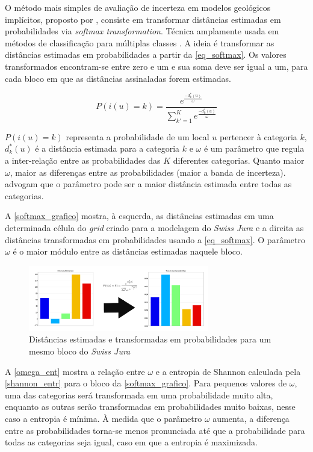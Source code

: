 O método mais simples de avaliação de incerteza em modelos geológicos implícitos, proposto por , consiste em transformar distâncias estimadas em probabilidades via \textit{softmax transformation}. Técnica amplamente usada em métodos de classificação para múltiplas classes \cite{mccullaghgeneralizedlinear}. A ideia é transformar as distâncias estimadas em probabilidades a partir da \autoref{eq_softmax}. Os valores transformados encontram-se entre zero e um e sua soma deve ser igual a um, para cada bloco em que as distâncias assinaladas forem estimadas.

\begin{equation}
	P(i(u)=k)=\frac{e^\frac{-d^*_k(u)}{\omega}}{\sum_{k'=1}^{K}e^\frac{-d^*_k(u)}{\omega}}
    \label{eq_softmax}
\end{equation}

$P(i(u)=k)$ representa a probabilidade de um local $u$ pertencer à categoria $k$, $d^*_k(u)$ é a distância estimada para a categoria $k$ e $\omega$ é um parâmetro que regula a inter-relação entre as probabilidades das $K$ diferentes categorias. Quanto maior $\omega$, maior as diferenças entre as probabilidades (maior a banda de incerteza).  advogam que o parâmetro pode ser a maior distância estimada entre todas as categorias. 

A \autoref{softmax_grafico} mostra, à esquerda, as distâncias estimadas em uma determinada célula do \textit{grid} criado para a modelagem do \textit{Swiss Jura} e a direita as distâncias transformadas em probabilidades usando a \autoref{eq_softmax}. O parâmetro $\omega$ é o maior módulo entre as distâncias estimadas naquele bloco.

\begin{figure}[H]
	\caption{\label{softmax_grafico}Distâncias estimadas e transformadas em probabilidades para um mesmo bloco do \textit{Swiss Jura}}
	\centering
		\includegraphics[width=0.7\textwidth]{capitulo_2/imagens/dis_to_probs.png}
\end{figure}

A \autoref{omega_ent} mostra a relação entre $\omega$ e a entropia de Shannon \cite{shannon1948mathematical} calculada pela \autoref{shannon_entr} para o bloco da \autoref{softmax_grafico}. Para pequenos valores de $\omega$, uma das categorias será transformada em uma probabilidade muito alta, enquanto as outras serão transformadas em probabilidades muito baixas, nesse caso a entropia é mínima. À medida que o parâmetro $\omega$ aumenta, a diferença entre as probabilidades torna-se menos pronunciada até que a probabilidade para todas as categorias seja igual, caso em que a entropia é maximizada.

